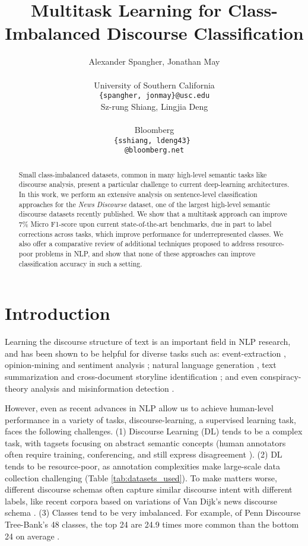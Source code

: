\documentclass[11pt]{article}
\title{Multitask Learning for Class-Imbalanced Discourse Classification}
\author{Alexander Spangher, Jonathan May \\ \\
  University of Southern California \\
  \texttt{\{spangher, jonmay\}@usc.edu} \\\And
  Sz-rung Shiang, Lingjia Deng \\ \\
  Bloomberg \\
  \texttt{\{sshiang, ldeng43\} }\\
  \texttt{@bloomberg.net} \\}
\begin{document}
\maketitle
\begin{abstract}
Small class-imbalanced datasets, common in many high-level semantic tasks like discourse analysis, present a particular challenge to current deep-learning architectures. In this work, we perform an extensive analysis on sentence-level classification approaches for the \textit{News Discourse} dataset, one of the largest high-level semantic discourse datasets recently published. We show that a multitask approach can improve 7\% Micro F1-score upon current state-of-the-art benchmarks, due in part to label corrections across tasks, which improve performance for underrepresented classes. 
We also offer a comparative review of additional techniques proposed to address resource-poor problems in NLP, and show that none of these approaches can improve classification accuracy in such a setting.
\end{abstract}

\section{Introduction}

Learning the discourse structure of text is an important field in NLP research, and has been shown to be helpful for diverse tasks such as: event-extraction \cite{choubey-etal-2020-discourse}, opinion-mining and sentiment analysis \cite{chenlo2014rhetorical}; natural language generation \cite{celikyilmaz2020evaluation}, text summarization \cite{lu2019attributed, isonuma2019unsupervised} and cross-document storyline identification \cite{rehm2019semantic}; and even conspiracy-theory analysis \cite{abbas2020politicizing} and misinformation detection \cite{zhou2020fake}.

However, even as recent advances in NLP allow us to achieve human-level performance in a variety of tasks, discourse-learning, a supervised learning task, faces the following challenges. (1) Discourse Learning (DL) tends to be a complex task, with tagsets focusing on abstract semantic concepts (human annotators often require training, conferencing, and still express disagreement \cite{das2017good}). (2) DL tends to be resource-poor, as annotation complexities make large-scale data collection challenging (Table \ref{tab:datasets_used}). To make matters worse, different discourse schemas often capture similar discourse intent with different labels, like recent corpora based on variations of Van Dijk's news discourse schema \cite{choubey-etal-2020-discourse, yarlott2018identifying,van2013news}.  (3) Classes tend to be very imbalanced. For example, of Penn Discourse Tree-Bank's 48 classes, the top 24 are 24.9 times more common than the bottom 24 on average \cite{prasad2008penn}.
\end{document}
